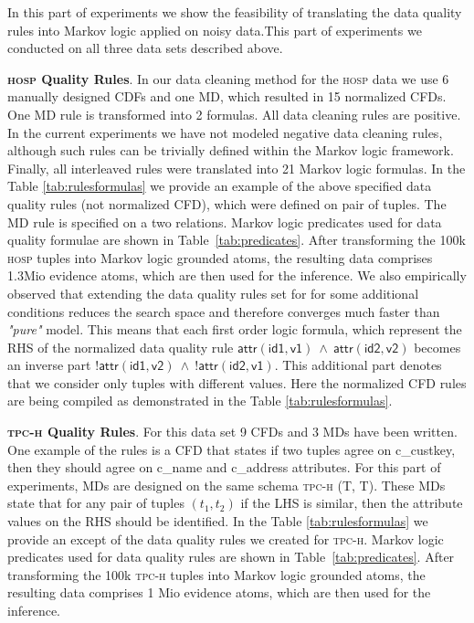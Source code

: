 In this part of experiments we show the feasibility of translating the data quality rules into Markov logic applied on noisy data.This part of experiments we conducted on all three data sets described above. 

\textbf{\textsc{hosp} Quality Rules}. In our data cleaning method for the \textsc{hosp} data we use 6 manually designed CDFs and one MD, which resulted in 15 normalized CFDs. One MD rule is transformed into 2 formulas. All data cleaning rules are positive. In the current experiments we have not modeled negative data cleaning rules, although such rules can be trivially defined within the Markov logic framework. Finally, all interleaved rules were translated into 21 Markov logic formulas. In the Table \ref{tab:rulesformulas} we provide an example of the above specified data quality rules (not normalized CFD), which were defined on pair of tuples. The MD rule is specified on a two relations. Markov logic predicates used for data quality formulae are shown in Table~\ref{tab:predicates}. After transforming the 100k \textsc{hosp} tuples into Markov logic grounded atoms, the resulting data comprises 1.3Mio evidence atoms, which are then used for the inference. We also empirically observed that extending the data quality rules set for for some additional conditions reduces the search space and therefore converges much faster than \textit{"pure"} model. This means that each first order logic formula, which represent the RHS of the normalized data quality rule $\mathsf{\textsf{attr}(id1, v1)~\wedge~\textsf{attr}(id2, v2)}$ becomes an inverse part $\mathsf{!\textsf{attr}(id1, v2)~\wedge~!\textsf{attr}(id2, v1)}$. This additional part denotes that we consider only tuples with different values. Here the normalized CFD rules are being compiled as demonstrated in the Table \ref{tab:rulesformulas}. 

\textbf{\textsc{tpc-h} Quality Rules}. For this data set 9 CFDs and 3 MDs have been written. One example of the rules is a CFD that states if two tuples agree on \textsf{c\_custkey}, then they should agree on \textsf{c\_name} and \textsf{c\_address} attributes. For this part of experiments, MDs are designed on the same schema \textsc{tpc-h} \textsf{(T, T)}. These MDs state that for any pair of tuples $(t_1,t_2)$ if the LHS is similar, then the attribute values on the RHS should be identified. In the Table \ref{tab:rulesformulas} we provide an except of the data quality rules we created for \textsc{tpc-h}.
Markov logic predicates used for data quality rules are shown in Table~\ref{tab:predicates}. After transforming the 100k \textsc{tpc-h} tuples into Markov logic grounded atoms, the resulting data comprises 1 Mio evidence atoms, which are then used for the inference.

